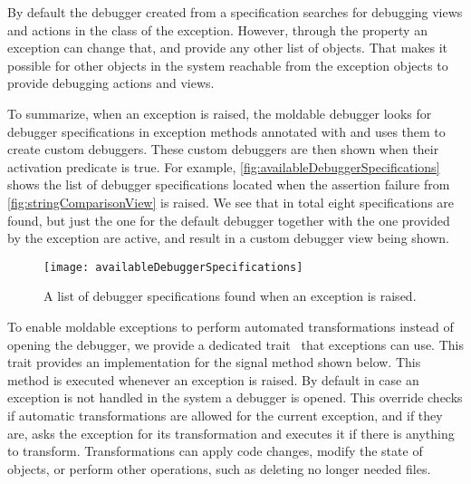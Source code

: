 \documentclass[sigplan,10pt]{acmart}
\begin{document}
By default the debugger created from a specification searches for debugging views and actions in the class of the exception.
However, through the  property an exception can change that, and provide any other list of objects.
That makes it possible for other objects in the system reachable from the exception objects to provide debugging actions and views.


To summarize, when an exception is raised, the moldable debugger looks for debugger specifications in exception methods annotated with   and uses them to create custom debuggers.
These custom debuggers are then shown when their activation predicate is true.
For example, \autoref{fig:availableDebuggerSpecifications} shows the list of debugger specifications located when the assertion failure from \autoref{fig:stringComparisonView} is raised.
We see that in total eight specifications are found, but just the one for the default debugger together with the one provided by the exception are active, and result in a custom debugger view being shown.

\begin{figure}[h]
  \texttt{[image: availableDebuggerSpecifications]}
  \caption{A list of debugger specifications found when an exception is raised.}
  \label{fig:availableDebuggerSpecifications}
\end{figure}

To enable moldable exceptions to perform automated transformations instead of opening the debugger, we provide a dedicated trait~\cite{Duca06b} that exceptions can use.
This trait provides an implementation for the signal method shown below.
This method is executed whenever an exception is raised.
By default in case an exception is not handled in the system a debugger is opened.
This override checks if automatic transformations are allowed for the current exception, and if they are, asks the exception for its transformation and executes it if there is anything to transform.
Transformations can apply code changes, modify the state of objects, or perform other operations, such as deleting no longer needed files.
\end{document}
